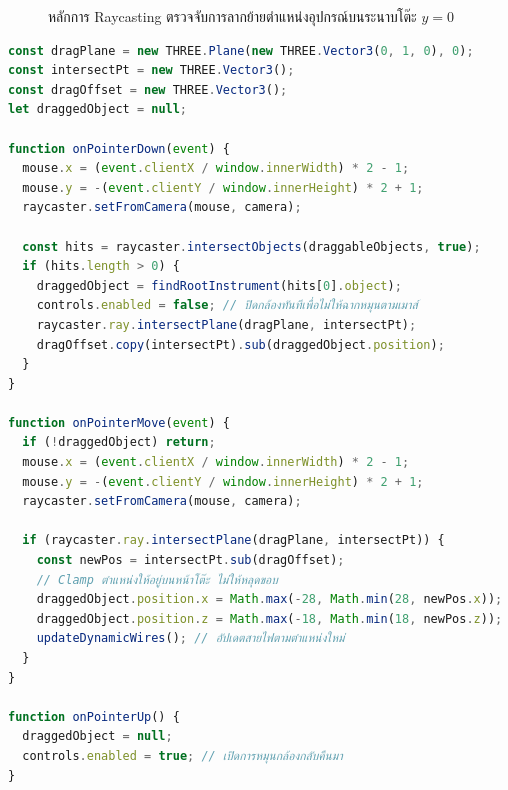 \begin{figure}[h!]
\centering
{}
\caption{หลักการ Raycasting ตรวจจับการลากย้ายตำแหน่งอุปกรณ์บนระนาบโต๊ะ $y=0$}
\label{fig:raycast_plane}
\end{figure}

\begin{lstlisting}[language=JavaScript, caption={ตรรกะการคำนวณ Raycasting และการปิด OrbitControls ชั่วคราว}]
const dragPlane = new THREE.Plane(new THREE.Vector3(0, 1, 0), 0);
const intersectPt = new THREE.Vector3();
const dragOffset = new THREE.Vector3();
let draggedObject = null;

function onPointerDown(event) {
  mouse.x = (event.clientX / window.innerWidth) * 2 - 1;
  mouse.y = -(event.clientY / window.innerHeight) * 2 + 1;
  raycaster.setFromCamera(mouse, camera);

  const hits = raycaster.intersectObjects(draggableObjects, true);
  if (hits.length > 0) {
    draggedObject = findRootInstrument(hits[0].object);
    controls.enabled = false; // ปิดกล้องทันทีเพื่อไม่ให้ฉากหมุนตามเมาส์
    raycaster.ray.intersectPlane(dragPlane, intersectPt);
    dragOffset.copy(intersectPt).sub(draggedObject.position);
  }
}

function onPointerMove(event) {
  if (!draggedObject) return;
  mouse.x = (event.clientX / window.innerWidth) * 2 - 1;
  mouse.y = -(event.clientY / window.innerHeight) * 2 + 1;
  raycaster.setFromCamera(mouse, camera);

  if (raycaster.ray.intersectPlane(dragPlane, intersectPt)) {
    const newPos = intersectPt.sub(dragOffset);
    // Clamp ตำแหน่งให้อยู่บนหน้าโต๊ะ ไม่ให้หลุดขอบ
    draggedObject.position.x = Math.max(-28, Math.min(28, newPos.x));
    draggedObject.position.z = Math.max(-18, Math.min(18, newPos.z));
    updateDynamicWires(); // อัปเดตสายไฟตามตำแหน่งใหม่
  }
}

function onPointerUp() {
  draggedObject = null;
  controls.enabled = true; // เปิดการหมุนกล้องกลับคืนมา
}
\end{lstlisting}

